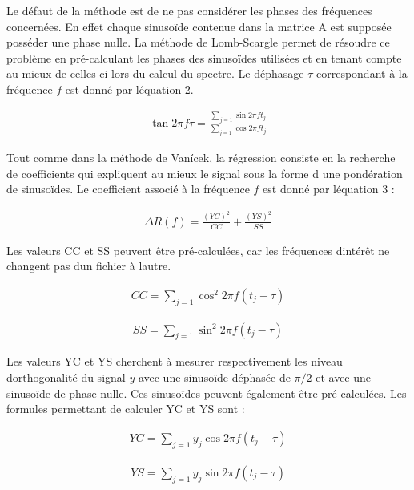 \documentclass[letterpaper]{article}
\begin{document}
Le défaut de la méthode est de ne pas considérer les phases des fréquences concernées. En effet chaque sinusoïde contenue dans la matrice A
est supposée posséder une phase nulle. La méthode de Lomb-Scargle permet de résoudre ce problème en pré-calculant les phases des sinusoïdes
utilisées et en tenant compte au mieux de celles-ci lors du calcul du spectre. Le déphasage $\tau$ correspondant à la fréquence $f$ est donné par
l\textquotesingle équation 2. \citep{LS}

\begin{align}
\tan 2\pi f \tau = \frac{\sum\limits_{j=1} \sin 2\pi f t_{j}}{\sum\limits_{j=1} \cos 2\pi f t_{j}}
\end{align}

Tout comme dans la méthode de Vanícek, la régression consiste en la recherche de coefficients qui expliquent au mieux le signal sous la forme d\textquotesingle
une pondération de sinusoïdes. Le coefficient associé à la fréquence $f$ est donné par l\textquotesingle équation 3 :

\begin{align}
\Delta R(f) = \frac{(YC)^{2}}{CC} 
+ \frac{(YS)^{2}}{SS}
\end{align}

Les valeurs CC et SS peuvent être pré-calculées, car les fréquences d\textquotesingle intérêt ne changent pas d\textquotesingle un fichier
à l\textquotesingle autre.

\begin{align}
CC = \sum\limits_{j=1} \cos^{2} 2\pi f (t_{j} - \tau)
\end{align}

\begin{align}
SS = \sum\limits_{j=1} \sin^{2} 2\pi f (t_{j} - \tau)
\end{align}

Les valeurs YC et YS cherchent à mesurer respectivement les niveau d\textquotesingle orthogonalité du signal $y$ avec une sinusoïde déphasée de $\pi / 2$
et avec une sinusoïde de phase nulle. Ces sinusoïdes peuvent également être pré-calculées. Les formules permettant de calculer YC et YS sont :

\begin{align}
YC = \sum\limits_{j=1} y_{j}\cos 2\pi f (t_{j} - \tau)
\end{align}

\begin{align}
YS = \sum\limits_{j=1} y_{j}\sin 2\pi f (t_{j} - \tau)
\end{align}
\end{document}
